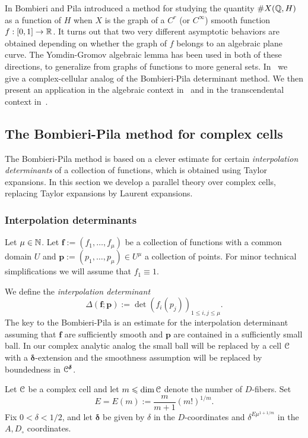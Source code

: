 \documentclass[reqno]{amsart}
\renewcommand\~[1]{\widetilde{#1}}
\def\vf{{\mathbf f}}
\def\vp{{\mathbf p}}
\def\vdelta{{\boldsymbol\delta}}
\begin{document}
In \cite{bombieri-pila} Bombieri and Pila introduced a method for
studying the quantity $\#X({\mathbb Q},H)$ as a function of $H$ when $X$ is the
graph of a $C^r$ (or $C^\infty$) smooth function $f:[0,1]\to{\mathbb R}$. It
turns out that two very different asymptotic behaviors are obtained
depending on whether the graph of $f$ belongs to an algebraic plane
curve. The Yomdin-Gromov algebraic lemma has been used in both of
these directions, to generalize from graphs of functions to more
general sets. In~ we give a complex-cellular
analog of the Bombieri-Pila determinant method. We then present an
application in the algebraic context in~ and
in the transcendental context in~.

\subsection{The Bombieri-Pila method for complex cells}
\label{sec:bp-complex}

The Bombieri-Pila method is based on a clever estimate for certain
\emph{interpolation determinants} of a collection of functions, which
is obtained using Taylor expansions. In this section we develop a
parallel theory over complex cells, replacing Taylor expansions by
Laurent expansions.

\subsubsection{Interpolation determinants}

Let $\mu\in{\mathbb N}$. Let $\vf:=(f_1,\ldots,f_\mu)$ be a collection of
functions with a common domain $U$ and
$\vp:=(p_1,\ldots,p_\mu)\in U^\mu$ a collection of points. For minor
technical simplifications we will assume that $f_1\equiv 1$.

We define the \emph{interpolation determinant}
\begin{equation}
  \Delta(\vf;\vp) := \det(f_i(p_j))_{1\le i,j\le\mu}.
\end{equation}
The key to the Bombieri-Pila \cite{bombieri-pila} is an estimate for
the interpolation determinant assuming that $\vf$ are sufficiently
smooth and $\vp$ are contained in a sufficiently small ball. In our
complex analytic analog the small ball will be replaced by a cell
${\mathcal C}$ with a $\vdelta$-extension and the smoothness assumption will be
replaced by boundedness in $\cC^\vdelta$.

Let ${\mathcal C}$ be a complex cell and let $m\leqslant\dim{\mathcal C}$ denote the number of
$D$-fibers. Set
\begin{equation}
  E=E(m):=\frac{m}{m+1}(m!)^{1/m}.
\end{equation}
Fix $0<\delta<1/2$, and let $\vdelta$ be given by $\delta$ in the
$D$-coordinates and $\delta^{E\mu^{1+1/m}}$ in the $A,D_\circ$
coordinates.
  
\end{document}
